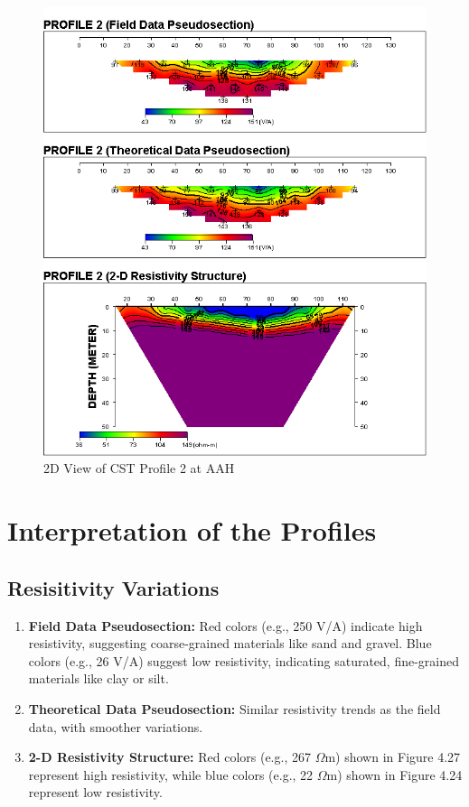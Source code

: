 \documentclass[12pt,a4paper]{report}
\begin{document}
\begin{figure}[H]
    \centering
    \includegraphics[width=1.0\textwidth]{PROFILE 2D (1).png}
    \caption{2D View of CST Profile 2 at AAH}
    \label{fig:aah_CST_2_Curve}
\end{figure}

\section{Interpretation of the Profiles}

\subsection{Resisitivity Variations}

\begin{enumerate}
    \item \textbf{Field Data Pseudosection:} Red colors (e.g., 250 V/A) indicate high resistivity, suggesting coarse-grained materials like sand and gravel. Blue colors (e.g., 26 V/A) suggest low resistivity, indicating saturated, fine-grained materials like clay or silt.

    \item \textbf{Theoretical Data Pseudosection:} Similar resistivity trends as the field data, with smoother variations.

    \item \textbf{2-D Resistivity Structure:} Red colors (e.g., 267 $\Omega$m) shown in Figure 4.27 represent high resistivity, while blue colors (e.g., 22 $\Omega$m) shown in Figure 4.24 represent low resistivity.

\end{enumerate}
\end{document}

